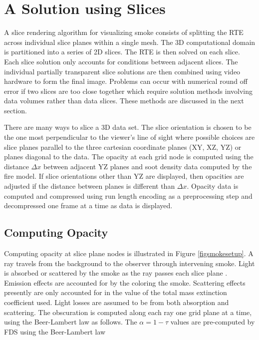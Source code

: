 \section{A Solution using Slices}
A slice rendering algorithm for visualizing smoke consists of splitting the RTE across individual slice planes within a single mesh.  The 3D computational domain is partitioned into a series of 2D slices.  The RTE is then solved on each slice.  Each slice solution only accounts for conditions between adjacent slices.  The individual partially transparent slice solutions are then combined using video hardware to form the final image.   Problems can occur with numerical round off error if two slices are too close together which require solution methods  involving data volumes rather than data slices. These methods are discussed in the next section.

There are many ways to slice a 3D data set.  The slice orientation is chosen to be the one most perpendicular to the viewer's line of sight where possible choices are slice planes parallel to the three cartesian coordinate planes (XY, XZ, YZ) or planes diagonal to the data.  The opacity at each grid node is computed using the distance $\Delta x$ between adjacent YZ planes and soot density data computed by the fire model.  If slice orientations other than YZ are displayed, then opacities are adjusted if the distance between planes is different than $\Delta x$.  Opacity data is computed and compressed using run length encoding as a preprocessing step and decompressed one frame at a time as data is displayed.


\subsection{Computing Opacity}
Computing opacity at slice plane nodes is illustrated in Figure \ref{figsmokesetup}. A ray travels from the background to the observer through intervening smoke. Light is absorbed or scattered by the smoke as the ray passes each slice plane .  Emission effects are accounted for by the coloring the smoke.  Scattering effects presently are only accounted for in the value of the total mass extinction coefficient used.  Light losses are assumed to be from both absorption and scattering. The obscuration is computed along each ray one grid plane at a time, using the Beer-Lambert law as follows.  The $\alpha=1-\tau$ values are pre-computed by FDS using the Beer-Lambert law~\cite{Siegel:2001}

